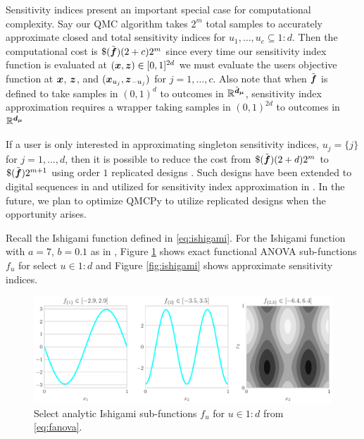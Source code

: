 \documentclass{article}[12pt]
\begin{document}
Sensitivity indices present an important special case for computational complexity. Say our QMC algorithm takes $2^m$ total samples to accurately approximate closed and total sensitivity indices for $u_1,\dots,u_c \subseteq 1:d$. Then the computational cost is $\$(\tilde{\bf})(2+c)2^m$ since every time our sensitivity index function is evaluated at $(\bx,\bz) \in [0,1]^{2d}$ we must evaluate the users objective function at $\bx$, $\bz$, and $(\bx_{u_j},\bz_{-{u_j}})$ for $j=1,\dots,c$. Also note that when $\tilde{\bf}$ is defined to take samples in  $(0,1)^{d}$ to outcomes in $\bbR^{\tilde{\bd}_{\bmu}}$, sensitivity index approximation requires a wrapper taking samples in $(0,1)^{2d}$ to outcomes in $\bbR^{\bd_{\bmu}}$

If a user is only interested in approximating singleton sensitivity indices, $u_j = \{j\}$ for $j=1,\dots,d$, then it is possible to reduce the cost from $\$(\tilde{\bf})(2+d)2^m$ to $\$(\tilde{\bf})2^{m+1}$ using order $1$ replicated designs \cite{alex2008comparison,tissot2015randomized}. Such designs have been extended to  digital sequences in \cite{replicated_designs_sobol_seq} and utilized for sensitivity index approximation in \cite{reliable_sobol_indices_approx}. In the future, we plan to optimize QMCPy to utilize replicated designs when the opportunity arises.

Recall the Ishigami function defined in \eqref{eq:ishigami}. For the Ishigami function with $a=7$, $b=0.1$ as in \cite{crestaux2007polynomial,marrel2009calculations}, Figure \ref{fig:ishigami_fu} shows exact functional ANOVA sub-functions $f_u$ for select $u \in 1:d$ and Figure \ref{fig:ishigami} shows approximate sensitivity indices. 

\begin{figure}[H]
    \centering
    \includegraphics[width=.8\textwidth]{figs/ishigami_fu.pdf}
    \caption{Select analytic Ishigami sub-functions $f_u$ for $u \in 1:d$ from \eqref{eq:fanova}.}
    \label{fig:ishigami_fu}
\end{figure}
\end{document}
